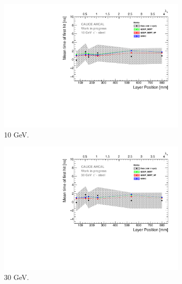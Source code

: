 \begin{figure}[htbp!]
  \begin{subfigure}[t]{0.49\textwidth}
    \centering
    \includegraphics[width=1\textwidth]{../Thesis_Plots/Timing/Pions/Plots/ComparisonToSim/Time_Depth_10GeV_Mokka.pdf}
    \caption{10 GeV.}\label{fig:Depth_SimData_10GeV}
  \end{subfigure}
  \hfill
  \begin{subfigure}[t]{0.49\textwidth}
    \centering
    \includegraphics[width=1\textwidth]{../Thesis_Plots/Timing/Pions/Plots/ComparisonToSim/Time_Depth_30GeV_Mokka.pdf}
    \caption{30 GeV.} \label{fig:Depth_SimData_30GeV}
  \end{subfigure}
  \hfill
  \begin{subfigure}[t]{0.49\textwidth}
    \centering

\end{subfigure}
\end{figure}

